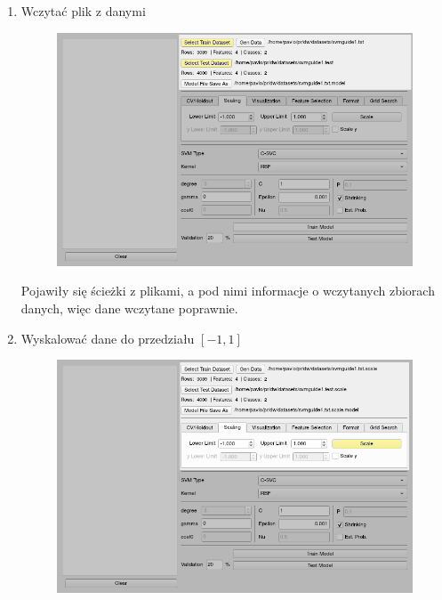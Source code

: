 \documentclass[paper=a4, fontsize=11pt]{scrartcl} %
\numberwithin{equation}{section} %
\numberwithin{figure}{section} %
\begin{document}
\begin{enumerate}[label={\textbf{Krok \theenumi :}},leftmargin=*]
    \item Wczytać plik z danymi

    \begin{figure}[H]
        \begin{center}
            \includegraphics[scale=0.7]{./img/ex1_st1.png}
        \end{center}
    \end{figure}

    Pojawiły się ścieżki z plikami, a pod nimi informacje o wczytanych zbiorach danych,
    więc dane wczytane poprawnie.

    \newpage
    \item Wyskalować dane do przedziału $[-1,1]$

    \begin{figure}[H]
        \begin{center}
            \includegraphics[scale=0.7]{./img/ex1_st2.png}
        \end{center}
    \end{figure}


\end{enumerate}
\end{document}
